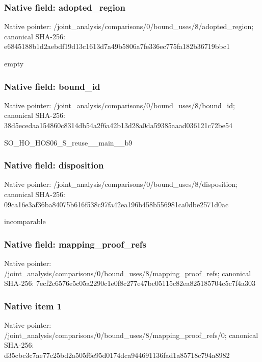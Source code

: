 \documentclass[10pt,a4paper]{article}
\begin{document}
\subsubsection{Native field: adopted\_\allowbreak{}region}
Native pointer: /joint\_\allowbreak{}analysis/comparisons/0/bound\_\allowbreak{}uses/8/adopted\_\allowbreak{}region; canonical SHA-256: e6845188b1d2aebdf19d13c1613d7a49b5806a7fe336ec775fa182b36719bbc1

\begingroup\raggedright\sloppy empty\par\endgroup

\subsubsection{Native field: bound\_\allowbreak{}id}
Native pointer: /joint\_\allowbreak{}analysis/comparisons/0/bound\_\allowbreak{}uses/8/bound\_\allowbreak{}id; canonical SHA-256: 38d5ecedaa154860c8314db54a2f6a42b13d28a0da59385aaad036121c72be54

\begingroup\raggedright\sloppy SO\_\allowbreak{}HO\_\allowbreak{}HOS06\_\allowbreak{}S\_\allowbreak{}reuse\_\allowbreak{}\_\allowbreak{}main\_\allowbreak{}\_\allowbreak{}b9\par\endgroup

\subsubsection{Native field: disposition}
Native pointer: /joint\_\allowbreak{}analysis/comparisons/0/bound\_\allowbreak{}uses/8/disposition; canonical SHA-256: 09ca16e3af36ba84075b616f538c97fa42ea196b458b556981ca0dbe2571d0ac

\begingroup\raggedright\sloppy incomparable\par\endgroup

\subsubsection{Native field: mapping\_\allowbreak{}proof\_\allowbreak{}refs}
Native pointer: /joint\_\allowbreak{}analysis/comparisons/0/bound\_\allowbreak{}uses/8/mapping\_\allowbreak{}proof\_\allowbreak{}refs; canonical SHA-256: 7ecf2c6576e5c05a2290c1e0f8c277e47bc05115c82ea825185704c5c7f4a303

\subsubsection{Native item 1}
Native pointer: /joint\_\allowbreak{}analysis/comparisons/0/bound\_\allowbreak{}uses/8/mapping\_\allowbreak{}proof\_\allowbreak{}refs/0; canonical SHA-256: d35cbc3c7ae77c25bd2a505f6e95d0174dca944691136fad1a85718c794a8982
\end{document}
